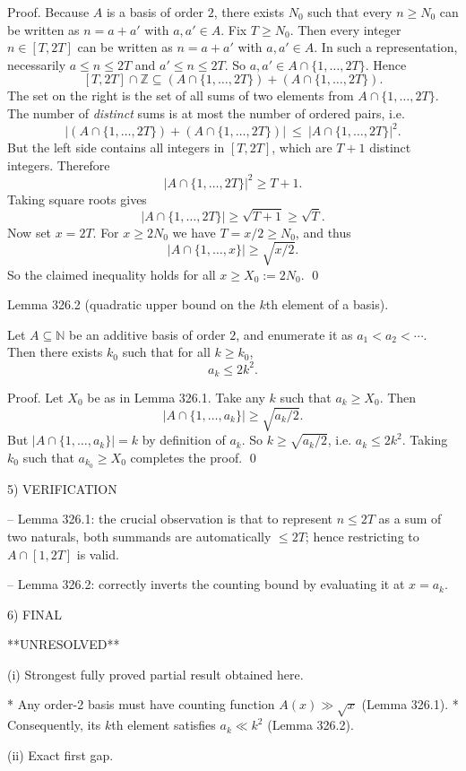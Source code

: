 Proof.
Because $A$ is a basis of order $2$, there exists $N_0$ such that every $n\ge N_0$ can be written as $n=a+a'$ with $a,a'\in A$.
Fix $T\ge N_0$.
Then every integer $n\in[T,2T]$ can be written as $n=a+a'$ with $a,a'\in A$.
In such a representation, necessarily $a\le n\le 2T$ and $a'\le n\le 2T$.
So $a,a'\in A\cap\{1,\dots,2T\}$.
Hence
\[
[T,2T]\cap\mathbb Z \subseteq (A\cap\{1,\dots,2T\}) + (A\cap\{1,\dots,2T\}).
\]
The set on the right is the set of all sums of two elements from $A\cap\{1,\dots,2T\}$.
The number of \emph{distinct} sums is at most the number of ordered pairs, i.e.
\[
\bigl| (A\cap\{1,\dots,2T\}) + (A\cap\{1,\dots,2T\}) \bigr|\ \le\ |A\cap\{1,\dots,2T\}|^2.
\]
But the left side contains all integers in $[T,2T]$, which are $T+1$ distinct integers.
Therefore
\[
|A\cap\{1,\dots,2T\}|^2 \ge T+1.
\]
Taking square roots gives
\[
|A\cap\{1,\dots,2T\}|\ge \sqrt{T+1} \ge \sqrt{T}.
\]
Now set $x=2T$. For $x\ge 2N_0$ we have $T=x/2\ge N_0$, and thus
\[
|A\cap\{1,\dots,x\}|\ge \sqrt{x/2}.
\]
So the claimed inequality holds for all $x\ge X_0:=2N_0$. \qed


Lemma 326.2 (quadratic upper bound on the $k$th element of a basis).

Let $A\subseteq\mathbb N$ be an additive basis of order $2$, and enumerate it as $a_1<a_2<\cdots$.
Then there exists $k_0$ such that for all $k\ge k_0$,
\[
a_k\le 2k^2.
\]

Proof.
Let $X_0$ be as in Lemma 326.1.
Take any $k$ such that $a_k\ge X_0$.
Then
\[
|A\cap\{1,\dots,a_k\}|\ge \sqrt{a_k/2}.
\]
But $|A\cap\{1,\dots,a_k\}|=k$ by definition of $a_k$.
So $k\ge \sqrt{a_k/2}$, i.e. $a_k\le 2k^2$.
Taking $k_0$ such that $a_{k_0}\ge X_0$ completes the proof. \qed


5) VERIFICATION

-- Lemma 326.1: the crucial observation is that to represent $n\le 2T$ as a sum of two naturals, both summands are automatically $\le 2T$; hence restricting to $A\cap[1,2T]$ is valid.

-- Lemma 326.2: correctly inverts the counting bound by evaluating it at $x=a_k$.


6) FINAL

**UNRESOLVED**

(i) Strongest fully proved partial result obtained here.

* Any order-2 basis must have counting function $A(x)\gg\sqrt{x}$ (Lemma 326.1).
* Consequently, its $k$th element satisfies $a_k\ll k^2$ (Lemma 326.2).

(ii) Exact first gap.

